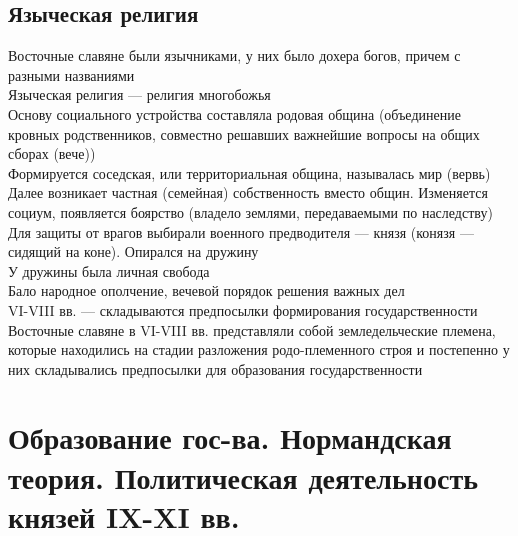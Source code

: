 \documentclass[a4paper, 11pt, oneside]{article}
\begin{document}
\subsection{Языческая религия}
Восточные славяне были язычниками, у них было дохера богов, причем с разными названиями\\
Языческая религия --- религия многобожья\\
Основу социального устройства составляла родовая община (объединение кровных родственников, совместно решавших важнейшие вопросы на общих сборах (вече))\\
Формируется соседская, или территориальная община, называлась мир (вервь)\\
Далее возникает частная (семейная) собственность вместо общин. Изменяется социум, появляется боярство (владело землями, передаваемыми по наследству)\\
Для защиты от врагов выбирали военного предводителя --- князя (конязя --- сидящий на коне). Опирался на дружину\\
У дружины была личная свобода\\
Бало народное ополчение, вечевой порядок решения важных дел\\
VI-VIII вв. --- складываются предпосылки формирования государственности\\
Восточные славяне в VI-VIII вв. представляли собой земледельческие племена, которые находились на стадии разложения родо-племенного строя и постепенно у них складывались предпосылки для образования государственности

\section{Образование гос-ва. Нормандская теория. Политическая деятельность князей IX-XI вв.}
\end{document}
